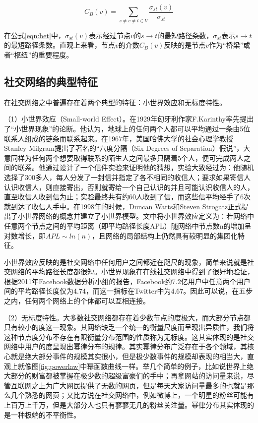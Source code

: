 \begin{equation}
  \label{eqn:bet}
  C_B(v)=\sum _{s\neq v\neq t \in V}\frac{\sigma_{st}(v)}{\sigma_{st}}
\end{equation}

在公式\ref{eqn:bet}中，$\sigma_{st}(v)$表示经过节点$v$的$s\rightarrow t$的最短路径条数，$\sigma_{st}$表示$s\rightarrow t$的最短路径条数。直观上来看，节点$v$的介数$C_B(v)$反映的是节点$v$作为“桥梁”或者“枢纽”的重要程度。

\subsection{社交网络的典型特征}

在社交网络之中普遍存在着两个典型的特征：小世界效应和无标度特性。

（1）小世界效应（Small-world Effect）。在1929年匈牙利作家F.Karinthy率先提出了“小世界现象”的论断。他认为，地球上的任何两个人都可以平均通过一条由5位联系人组成的链条而联系起来。在1967年，美国哈佛大学的社会心理学教授Stanley Milgram提出了著名的“六度分隔（Six Degrees of Separation）假说”，大意同样为任何两个想要取得联系的陌生人之间最多只隔着5个人，便可完成两人之间的联系。他通过设计了一个信件实验来证明他的猜想，实验大致经过为：他随机选择了300多人，每人分发了一封信并指定了各不相同的收信人；要求如果寄信人认识收信人，则直接寄出，否则就寄给一个自己认识的并且可能认识收信人的人，直至收信人收到信为止；实验最终共有约60人收到了信，而这些信平均经手了6次就到达了收信人手中。在1998年的时候，Duncan Watts和Steven Strogatz正式提出了小世界网络的概念并建立了小世界模型\cite{Watts1998Collectivedynamics}。文中将小世界效应定义为：若网络中任意两个节点之间的平均距离（即平均路径长度APL）随网络中节点数n的增加呈对数增长，即$APL\sim ln(n)$，且网络的局部结构上仍然具有较明显的集团化特征。

小世界效应反映的是社交网络中任何用户之间都近在咫尺的现象，简单来说就是社交网络的平均路径长度都很短。小世界现象在在线社交网络中得到了很好地验证，根据2011年Facebook数据分析小组的报告，Facebook约7.2亿用户中任意两个用户间的平均路径长度仅为4.74，而这一指标在Twitter中为4.67。因此可以说，在五步之内，任何两个网络上的个体都可以互相连接。

（2）无标度特性。大多数社交网络都存在着少数节点的度极大，而大部分节点都只有较小的度这一现象。其网络缺乏一个统一的衡量尺度而呈现出异质性，我们将这种节点度分布不存在有限衡量分布范围的性质称为无标度。这其实体现的是社交网络中用户的度呈现出幂律分布的规律。其实幂律分布广泛存在于各个领域，其核心就是绝大部分事件的规模其实很小，但是极少数事件的规模却表现的相当大，直观上就像图\ref{fig:powerlaw}中幂函数曲线一样。举几个简单的例子，比如说世界上绝大部分的财富都被掌握在极少数的超级富豪们的手中；再拿网站的访问量来说，尽管互联网之上为广大网民提供了无数的网页，但是每天大家访问量最多的也就是那么几个熟悉的网页；又比方说在社交网络中，例如微博上，一个明星的粉丝可能有上百万上千万，但是大部分人也只有寥寥无几的粉丝关注量。幂律分布其实体现的是一种极端的不平衡性。

